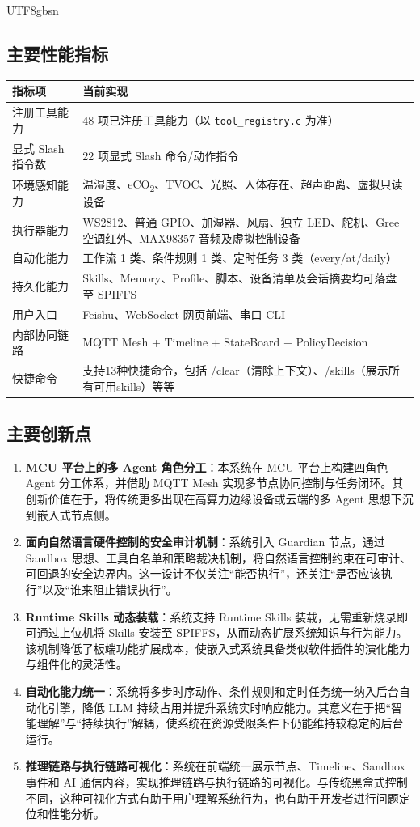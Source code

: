 \documentclass[a4paper,12pt]{article}
\begin{document}
\begin{CJK*}{UTF8}{gbsn}
\subsection{主要性能指标}
\begin{table}[h]
\centering
\begin{tabular}{p{4.2cm}p{8.6cm}}
\toprule
\textbf{指标项} & \textbf{当前实现} \\
\midrule
注册工具能力 & 48 项已注册工具能力（以 \texttt{tool\_registry.c} 为准） \\
显式 Slash 指令数 & 22 项显式 Slash 命令/动作指令 \\
环境感知能力 & 温湿度、eCO\textsubscript{2}、TVOC、光照、人体存在、超声距离、虚拟只读设备 \\
执行器能力 & WS2812、普通 GPIO、加湿器、风扇、独立 LED、舵机、Gree 空调红外、MAX98357 音频及虚拟控制设备 \\
自动化能力 & 工作流 1 类、条件规则 1 类、定时任务 3 类（every/at/daily） \\
持久化能力 & Skills、Memory、Profile、脚本、设备清单及会话摘要均可落盘至 SPIFFS \\
用户入口 & Feishu、WebSocket 网页前端、串口 CLI \\
内部协同链路 & MQTT Mesh + Timeline + StateBoard + PolicyDecision \\
快捷命令 & 支持13种快捷命令，包括 /clear（清除上下文）、/skills（展示所有可用skills）等等 \\
\bottomrule
\end{tabular}
\end{table}

\subsection{主要创新点}
\begin{enumerate}
  \item \textbf{MCU 平台上的多 Agent 角色分工}：本系统在 MCU 平台上构建四角色 Agent 分工体系，并借助 MQTT Mesh 实现多节点协同控制与任务闭环。其创新价值在于，将传统更多出现在高算力边缘设备或云端的多 Agent 思想下沉到嵌入式节点侧。
  \item \textbf{面向自然语言硬件控制的安全审计机制}：系统引入 Guardian 节点，通过 Sandbox 思想、工具白名单和策略裁决机制，将自然语言控制约束在可审计、可回退的安全边界内。这一设计不仅关注“能否执行”，还关注“是否应该执行”以及“谁来阻止错误执行”。
  \item \textbf{Runtime Skills 动态装载}：系统支持 Runtime Skills 装载，无需重新烧录即可通过上位机将 Skills 安装至 SPIFFS，从而动态扩展系统知识与行为能力。该机制降低了板端功能扩展成本，使嵌入式系统具备类似软件插件的演化能力与组件化的灵活性。
  \item \textbf{自动化能力统一}：系统将多步时序动作、条件规则和定时任务统一纳入后台自动化引擎，降低 LLM 持续占用并提升系统实时响应能力。其意义在于把“智能理解”与“持续执行”解耦，使系统在资源受限条件下仍能维持较稳定的后台运行。
  \item \textbf{推理链路与执行链路可视化}：系统在前端统一展示节点、Timeline、Sandbox 事件和 AI 通信内容，实现推理链路与执行链路的可视化。与传统黑盒式控制不同，这种可视化方式有助于用户理解系统行为，也有助于开发者进行问题定位和性能分析。
\end{enumerate}


\end{CJK*}
\end{document}
